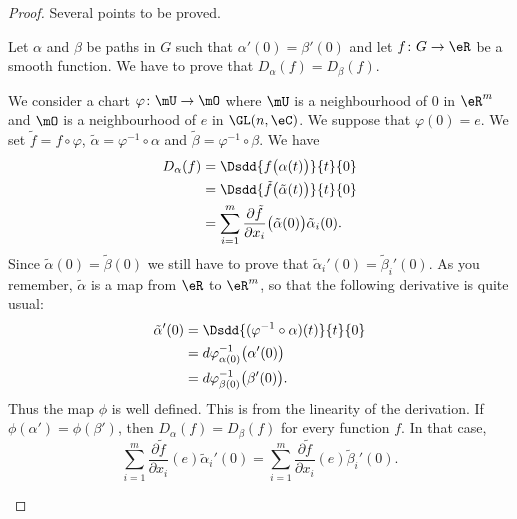 \begin{proof}
	Several points to be proved.
	\begin{subproof}
		Let \( \alpha\) and \( \beta\) be paths in \( G\) such that \( \alpha'(0)=\beta'(0)\) and let \( f\colon G\to \eR\) be a smooth function. We have to prove that \( D_{\alpha}(f)=D_{\beta}(f)\).

		We consider a chart \( \varphi\colon \mU\to \mO\) where \( \mU\) is a neighbourhood of \( 0\) in \( \eR^m\) and \( \mO\) is a neighbourhood of \( e\) in \( \GL(n,\eC)\). We suppose that \( \varphi(0)=e\). We set \( \tilde f=f\circ \varphi\), \( \tilde \alpha=\varphi^{-1}\circ \alpha\) and \( \tilde \beta=\varphi^{-1}\circ\beta\). We have
		\begin{subequations}
			\begin{align}
				D_{\alpha}(f) & =\Dsdd{ f\big( \alpha(t) \big) }{t}{0}                                                                 \\
				              & =\Dsdd{ \tilde f\big( \tilde \alpha(t) \big) }{t}{0}                                                   \\
				              & =\sum_{i=1}^m\frac{ \partial \tilde f }{ \partial x_i }\big( \tilde \alpha(0) \big)\tilde \alpha_i(0).
			\end{align}
		\end{subequations}
		Since \( \tilde \alpha(0)=\tilde \beta(0)\) we still have to prove that \( \tilde \alpha_i'(0)=\tilde \beta_i'(0)\). As you remember, \( \tilde \alpha\) is a map from \( \eR\) to \( \eR^m\), so that the following derivative is quite usual:
		\begin{subequations}
			\begin{align}
				\tilde \alpha'(0) & =\Dsdd{ (\varphi^{-1}\circ \alpha)(t) }{t}{0}    \\
				                  & =d\varphi^{-1}_{\alpha(0)}\big( \alpha'(0) \big) \\
				                  & =d\varphi^{-1}_{\beta(0)}\big( \beta'(0) \big).
			\end{align}
		\end{subequations}
		Thus the map \( \phi\) is well defined.
		This is from the linearity of the derivation.
		If \( \phi(\alpha')=\phi(\beta')\), then \( D_{\alpha}(f)=D_{\beta}(f)\) for every function \( f\). In that case,
		\begin{equation}
			\sum_{i=1}^m\frac{ \partial \tilde f }{ \partial x_i }(e)\tilde \alpha_i'(0)=\sum_{i=1}^m\frac{ \partial \tilde f }{ \partial x_i }(e)\tilde \beta_i'(0).

\end{equation}
\end{subproof}
\end{proof}
